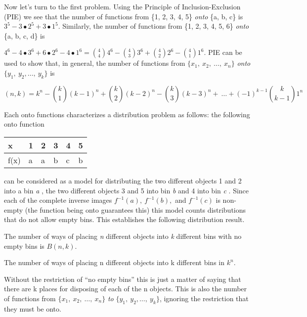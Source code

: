 Now let's turn to the first problem. Using the Principle of
Inclusion-Exclusion (PIE) we see that the number of functions from \{1,
2, 3, 4, 5\} \emph{onto} \{a, b, c\} is
\(3^{5} - 3 \bullet 2^{5} + 3 \bullet 1^{5}\). Similarly, the number of
functions from \{1, 2, 3, 4, 5, 6\} \emph{onto} \{a, b, c, d\} is

\(4^{6} - 4 \bullet 3^{6} + 6 \bullet 2^{6} - 4 \bullet 1^{6} =
\binom{4}{4}
4^{6} -
\binom{4}{3}
3^{6} +
\binom{4}{2}
2^{6} -
\binom{4}{1}
1^{6}.\) PIE can be used to show that, in general, the
number of functions from \(\{ x_{1},\ x_{2},\ \ldots,\ x_{n}\}\)
\emph{onto} \(\{ y_{1},\ y_{2},\ldots,\ y_{k}\}\) is

\[
\left( n,k \right) = k^{n} - \binom{k}{1} \left( k - 1 \right)^{n} + \binom{k}{2} \left( k - 2 \right)^{n} - \binom{k}{3} \left( k - 3 \right)^{n} + \ \ldots + \left( - 1 \right)^{k - 1}\binom{k}{k - 1} 1^{n}
\]

Each onto functions characterizes a distribution problem as follows: the
following onto function
\begin{longtable}[]{@{}llllll@{}}
\toprule
x & 1 & 2 & 3 & 4 & 5\tabularnewline
\midrule
\endhead
f(x) & a & a & b & c & b\tabularnewline
\bottomrule

\end{longtable}

can be considered as a model for distributing the two different objects
1 and 2 into a bin \emph{a} , the two different objects 3 and 5 into bin
\emph{b} and 4 into bin \emph{c} . Since each of the complete inverse
images \(f^{- 1}\left( a \right),\ f^{- 1}\left( b \right),\) and
\(f^{- 1}(c)\) is non-empty (the function being onto guarantees this)
this model counts distributions that do not allow empty bins. This
establishes the following distribution result.

\begin{result}
	 The number of ways of placing \emph{n} different objects into
\emph{k} different bins with no empty bins is \(B(n,k)\).
\end{result}
\begin{result}
	 The number of ways of placing n different objects into k
different bins in \(k^{n}.\)
\end{result}
Without the restriction of ``no empty bins'' this is just a matter of
saying that there are k places for disposing of each of the n objects.
This is also the number of functions from
\(\{ x_{1},\ x_{2},\ \ldots,\ x_{n}\}\) \emph{to}
\(\{ y_{1},\ y_{2},\ldots,\ y_{k}\}\), ignoring the restriction that
they must be onto.


